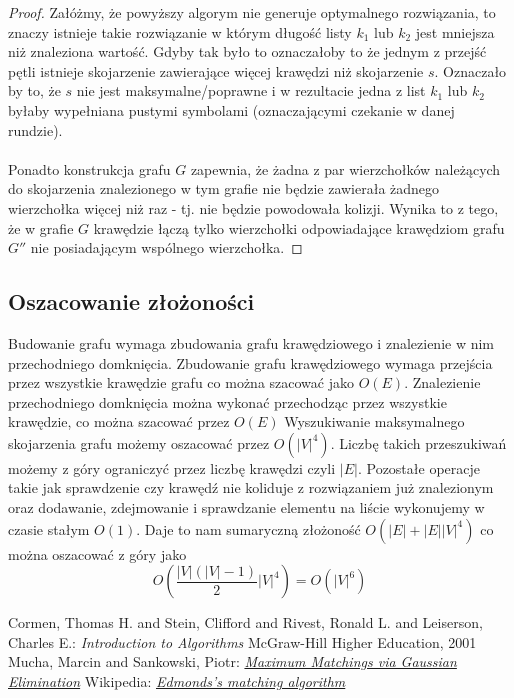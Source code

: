\documentclass{llncs}
\begin{document}
\begin{proof}
Załóżmy, że powyższy algorym nie generuje optymalnego rozwiązania, to znaczy istnieje
takie rozwiązanie w którym długość listy $k_1$ lub $k_2$ jest mniejsza niż znaleziona wartość.
Gdyby tak było to oznaczałoby to że jednym z przejść pętli istnieje
skojarzenie zawierające więcej krawędzi niż skojarzenie $s$. 
Oznaczało by to, że $s$ nie jest maksymalne/poprawne i w rezultacie jedna z list $k_1$ lub $k_2$ byłaby wypełniana pustymi
symbolami (oznaczającymi czekanie w danej rundzie). 
\\\\
Ponadto konstrukcja grafu $G$ zapewnia, że żadna z par wierzchołków należących do skojarzenia znalezionego w tym grafie nie będzie zawierała żadnego wierzchołka więcej niż raz - tj. nie będzie powodowała kolizji. Wynika to z tego, że w grafie $G$ krawędzie łączą tylko wierzchołki odpowiadające krawędziom grafu $G''$ nie posiadającym wspólnego wierzchołka.
\end{proof}

\subsection{Oszacowanie złożoności}
Budowanie grafu wymaga zbudowania grafu krawędziowego i znalezienie w nim przechodniego domknięcia. Zbudowanie grafu krawędziowego
wymaga przejścia przez wszystkie krawędzie grafu co można 
szacować jako $O(E)$. Znalezienie przechodniego domknięcia
można wykonać przechodząc przez wszystkie krawędzie, 
co można szacować przez $O(E)$
Wyszukiwanie maksymalnego skojarzenia grafu możemy oszacować przez $O(|V|^4)$\cite{wiki-blossom}.
Liczbę takich przeszukiwań możemy z góry ograniczyć przez liczbę krawędzi czyli $|E|$. 
Pozostałe operacje takie jak sprawdzenie czy krawędź nie koliduje z rozwiązaniem już znalezionym
oraz dodawanie, zdejmowanie i sprawdzanie elementu na liście wykonujemy w czasie stałym $O(1)$.
Daje to nam sumaryczną złożoność $O(|E|+|E||V|^4)$ co można oszacować z góry jako 
\begin{equation}
O(\frac{|V|(|V|-1)}{2} |V|^4) = O(|V|^6)
\end{equation}

%
%
\begin{thebibliography}{4}
%
Cormen, Thomas H. and Stein, Clifford and Rivest, Ronald L. and Leiserson, Charles E.:
\textsl{Introduction to Algorithms}
McGraw-Hill Higher Education, 2001
Mucha, Marcin and Sankowski, Piotr:
\textsl{\href{http://www.mimuw.edu.pl/~mucha/pub/mucha_sankowski_focs04.pdf}{Maximum Matchings via Gaussian Elimination}}
Wikipedia:
\textsl{\href{http://en.wikipedia.org/wiki/Blossom_algorithm}{Edmonds's matching algorithm}}
\end{thebibliography}
\end{document}
